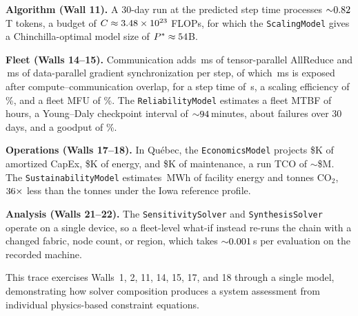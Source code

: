 \documentclass[10pt,twocolumn]{article}
\begin{document}
\textbf{Algorithm (Wall 11).} A 30-day run at the predicted step time processes ${\sim}0.82$T tokens, a budget of $C \approx 3.48\times 10^{23}$ FLOPs, for which the \texttt{ScalingModel} gives a Chinchilla-optimal model size of $P^{*} \approx 54$B.

\textbf{Fleet (Walls 14--15).} Communication adds \CaseRThreeTpCommMs\,ms of tensor-parallel AllReduce and \CaseRThreeDpCommMs\,ms of data-parallel gradient synchronization per step, of which \CaseRThreeDpExposedMs\,ms is exposed after compute--communication overlap, for a step time of \CaseRThreeStepSeconds\,s, a scaling efficiency of \CaseRThreeScalingEffPct\%, and a fleet MFU of \CaseRThreeMfuPct\%. The \texttt{ReliabilityModel} estimates a fleet MTBF of \CaseRThreeFleetMtbfHours\,hours, a Young--Daly checkpoint interval of ${\sim}94$\,minutes, about \CaseRThreeExpectedFailures{} failures over 30 days, and a goodput of \CaseRThreeGoodputPct\%.

\textbf{Operations (Walls 17--18).} In Qu\'ebec, the \texttt{EconomicsModel} projects \$\CaseRThreeCapexK{}K of amortized CapEx, \$\CaseRThreeEnergyK{}K of energy, and \$\CaseRThreeMaintenanceK{}K of maintenance, a run TCO of ${\sim}$\$\CaseRThreeTcoM{}M. The \texttt{SustainabilityModel} estimates \CaseRThreeEnergyMWh\,MWh of facility energy and \CaseRThreeCarbonTonnes{} tonnes CO$_2$, $36{\times}$ less than the \CaseRThreeIowaCarbonTonnes{} tonnes under the Iowa reference profile.

\textbf{Analysis (Walls 21--22).} The \texttt{SensitivitySolver} and \texttt{SynthesisSolver} operate on a single device, so a fleet-level what-if instead re-runs the chain with a changed fabric, node count, or region, which takes ${\sim}0.001$\,s per evaluation on the recorded machine.

This trace exercises Walls~1, 2, 11, 14, 15, 17, and 18 through a single model, demonstrating how solver composition produces a system assessment from individual physics-based constraint equations.
\end{document}

